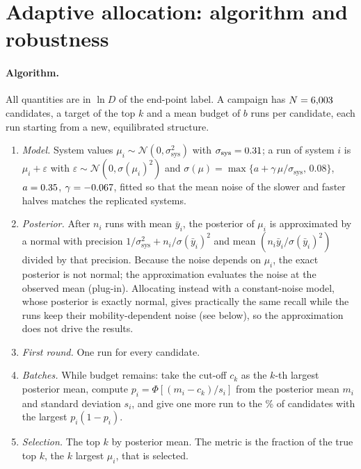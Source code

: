 \documentclass[11pt]{article}
\begin{document}
\begin{table}[!htbp]
\centering
\caption{Settings chosen on half of the systems and evaluated on the other half (median over
\frSplits{} random partitions): mean simulated time, typical error, and percentage of partitions
in which the held-out half meets the target; n/a means that no setting met the target on the
half used for the choice.}\label{si:tab:frontier}
\resizebox{\textwidth}{!}{}
\end{table}

\section{Adaptive allocation: algorithm and robustness}\label{si:sec:alloc}
\paragraph{Algorithm.} All quantities are in $\ln D$ of the end-point label. A campaign has
$N=6{,}003$ candidates, a target of the top $k$ and a mean budget of $b$ runs per candidate, each run
starting from a new, equilibrated structure.
\begin{enumerate}[leftmargin=*,itemsep=1pt]
  \item \emph{Model.} System values $\mu_i\sim\mathcal N(0,\sigma_{\mathrm{sys}}^2)$ with
        $\sigma_{\mathrm{sys}}=0.31$; a run of system $i$ is $\mu_i+\varepsilon$ with
        $\varepsilon\sim\mathcal N(0,\sigma(\mu_i)^2)$ and
        $\sigma(\mu)=\max\{a+\gamma\,\mu/\sigma_{\mathrm{sys}},\,0.08\}$, $a=0.35$,
        $\gamma=-0.067$, fitted so that the mean noise of the slower and faster halves matches the
        replicated systems.
  \item \emph{Posterior.} After $n_i$ runs with mean $\bar y_i$, the posterior of $\mu_i$ is
        approximated by a normal with precision $1/\sigma_{\mathrm{sys}}^2+n_i/\sigma(\bar y_i)^2$
        and mean $(n_i\bar y_i/\sigma(\bar y_i)^2)$ divided by that precision. Because the noise
        depends on $\mu_i$, the exact posterior is not normal; the approximation evaluates the noise
        at the observed mean (plug-in). Allocating instead with a constant-noise model, whose posterior
        is exactly normal, gives practically the same recall while the runs keep their
        mobility-dependent noise (see below), so the approximation does not drive the results.
  \item \emph{First round.} One run for every candidate.
  \item \emph{Batches.} While budget remains: take the cut-off $c_k$ as the $k$-th largest
        posterior mean, compute $p_i=\Phi[(m_i-c_k)/s_i]$ from the posterior mean $m_i$ and standard
        deviation $s_i$, and give one more run to the \alBatchPct\% of candidates with the largest
        $p_i(1-p_i)$.
  \item \emph{Selection.} The top $k$ by posterior mean. The metric is the fraction of the true
        top $k$, the $k$ largest $\mu_i$, that is selected.
\end{enumerate}
\end{document}
